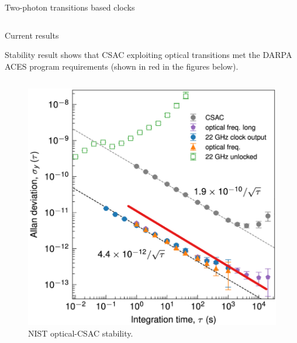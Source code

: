 \begin{frame}{Two-photon transitions based clocks}
\begin{columns}[c, onlytextwidth]
\begin{column}{0.45\textwidth}
        \end{column}

    \end{columns}


\end{frame}



\begin{frame}{Current results}

    Stability result shows that CSAC exploiting optical transitions met the DARPA ACES program requirements (shown in red in the figures below).

    \begin{columns}[T, onlytextwidth]

        \begin{column}{0.35\textwidth}

            \begin{figure}
                \centering
                \includegraphics[width=\textwidth]{img/NIST-stability.png}
                \caption{NIST optical-CSAC stability.}
            \end{figure}

        \end{column}

        \hfill


\end{columns}
\end{frame}
